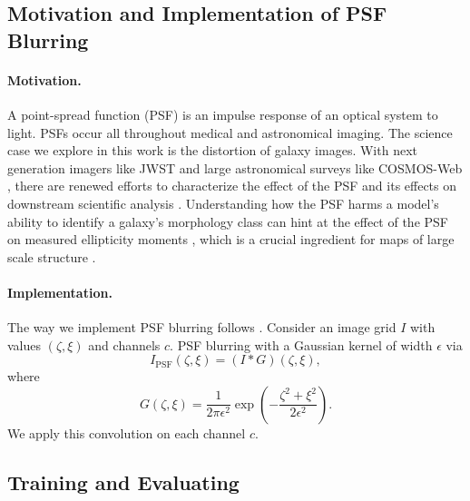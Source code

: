 \documentclass[10pt]{article} %
\theoremstyle{definition}
\begin{document}
\subsection{Motivation and Implementation of PSF Blurring} \label{sec:PSF}

\paragraph{Motivation.} A point-spread function (PSF) is an impulse response of an optical system to light. PSFs occur all throughout medical and astronomical imaging. The science case we explore in this work is the distortion of galaxy images. With next generation imagers like JWST and large astronomical surveys like COSMOS-Web \citep{casey2023cosmos}, there are renewed efforts to characterize the effect of the PSF and its effects on downstream scientific analysis \citep{perrin2014updated, Birrer2021, jarvis2021dark, Michalewicz2023, liaudat2023rethinking, berman2024efficientpsfmodelingshoptjl, Berman2024, feng2025exoplanet, polzin2025spiketooldrizzlehst}. Understanding how the PSF harms a model's ability to identify a galaxy's morphology class can hint at the effect of the PSF on measured ellipticity moments \citep{hirata2003shear,mandelbaum2005systematic}, which is a crucial ingredient for maps of large scale structure \citep{ mccleary2015mass, mccleary2020dark, Scognamiglio2024Exploring}. 

\paragraph{Implementation.} The way we implement PSF blurring follows \cite{sneh_mlst}. Consider an image grid $I$ with values $(\zeta, \xi)$ and channels $c$. PSF blurring with a Gaussian kernel of width $\epsilon$ via
%
\begin{equation*}
    I_{\text{PSF}}(\zeta, \xi) = (I*G)(\zeta, \xi),
\end{equation*}
%
where 
%
\begin{equation*}
    G(\zeta, \xi) = \frac{1}{2\pi \epsilon^2}\exp \left(-\frac{\zeta^2 + \xi^2}{2\epsilon^2}\right).
\end{equation*}
%
We apply this convolution on each channel $c$.

\subsection{Training and Evaluating} \label{sec:exp_psf}
\end{document}
